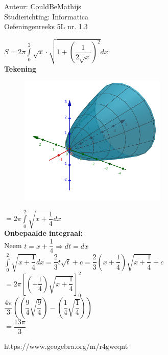 \documentclass[a4paper]{article}
\newcommand{\bint}{\displaystyle\int\limits}
\begin{document}
  
\noindent \large Auteur: CouldBeMathijs \\
\noindent \large Studierichting: Informatica\\
\noindent \large Oefeningenreeks 5L nr. 1.3\\

\medskip

\normalsize

$S = 2 \pi \bint_0^2 \sqrt{x} \cdot \sqrt{1+\left(\dfrac{1}{2\sqrt{x}}\right)^2} dx$\\

\textbf{Tekening}\\

\begin{figure}[h]
	\centering
	\includegraphics[width=7cm]{5L-1.3-could.be.mathijs.INF.png}
\end{figure}

$ = 2 \pi \bint_0^2 \sqrt{x + \dfrac{1}{4}} dx$\\

\textbf{Onbepaalde integraal:}\\

Neem $t = x + \dfrac{1}{4} \Rightarrow dt = dx$\\

$\bint_0^2 \sqrt{x + \dfrac{1}{4}} dx = \dfrac{2}{3}t\sqrt{t} + c = \dfrac{2}{3}\left(x + \dfrac{1}{4} \right) \sqrt{ x + \dfrac{1}{4} } + c$\\

$ = 2 \pi \left[\left(+\dfrac{1}{4}\right)\sqrt{x+\dfrac{1}{4}}\right]_0^2$\\

$ \dfrac{4\pi}{3}\left(\left(\dfrac{9}{4}\sqrt{\dfrac{9}{4}}\right) - \left(\dfrac{1}{4}\sqrt{\dfrac{1}{4}}\right)\right)$\\

$ = \dfrac{13 \pi}{3}$

\begin{thebibliography}{999}
\bibitem{} https://www.geogebra.org/m/r4gweqnt
\end{thebibliography}
\end{document}
